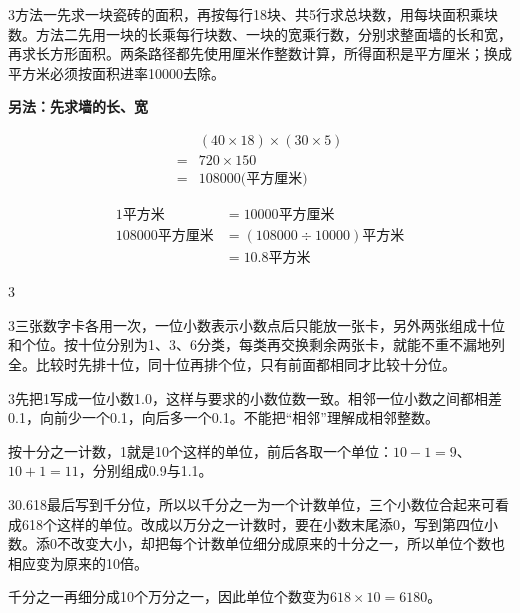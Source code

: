 \documentclass[multi=snippet,border={5bp 20bp 5bp 5bp}]{standalone}
\newenvironment{snippet}[3]{\begin{minipage}{#1bp}\color{answerred}\fontsize{#2}{#3}\selectfont\raggedright}{\end{minipage}}
\begin{document}
\begin{snippet}{505}{11.5}{14}\begin{multicols}{3}\raggedcolumns 方法一先求一块瓷砖的面积，再按每行18块、共5行求总块数，用每块面积乘块数。方法二先用一块的长乘每行块数、一块的宽乘行数，分别求整面墙的长和宽，再求长方形面积。两条路径都先使用厘米作整数计算，所得面积是平方厘米；换成平方米必须按面积进率10000去除。\par \textbf{另法：先求墙的长、宽}\par\noindent\[\displaystyle \begin{aligned}&(40\times18)\times(30\times5)\\={}&720\times150\\={}&108000\text{(平方厘米)}\end{aligned}\]\par \noindent\end{multicols}\[\displaystyle \begin{aligned}1\text{平方米}&=10000\text{平方厘米}\\108000\text{平方厘米}&=(108000\div10000)\text{平方米}\\&=10.8\text{平方米}\end{aligned}\]\begin{multicols}{3}\raggedcolumns \par\end{multicols}\end{snippet}
\begin{snippet}{505}{11.5}{14}\begin{multicols}{3}\raggedcolumns 三张数字卡各用一次，一位小数表示小数点后只能放一张卡，另外两张组成十位和个位。按十位分别为1、3、6分类，每类再交换剩余两张卡，就能不重不漏地列全。比较时先排十位，同十位再排个位，只有前面都相同才比较十分位。\end{multicols}\end{snippet}
\begin{snippet}{505}{11.5}{14}\begin{multicols}{3}\raggedcolumns 先把1写成一位小数1.0，这样与要求的小数位数一致。相邻一位小数之间都相差0.1，向前少一个0.1，向后多一个0.1。不能把“相邻”理解成相邻整数。\par 按十分之一计数，1就是10个这样的单位，前后各取一个单位：\(10-1=9\)\allowbreak 、\(10+1=11\)\allowbreak ，分别组成0.9与1.1。\end{multicols}\end{snippet}
\begin{snippet}{505}{11.5}{14}\begin{multicols}{3}\raggedcolumns 0.618最后写到千分位，所以以千分之一为一个计数单位，三个小数位合起来可看成618个这样的单位。改成以万分之一计数时，要在小数末尾添0，写到第四位小数。添0不改变大小，却把每个计数单位细分成原来的十分之一，所以单位个数也相应变为原来的10倍。\par 千分之一再细分成10个万分之一，因此单位个数变为\(618\times10=6180\)\allowbreak 。\end{multicols}\end{snippet}
\end{document}
